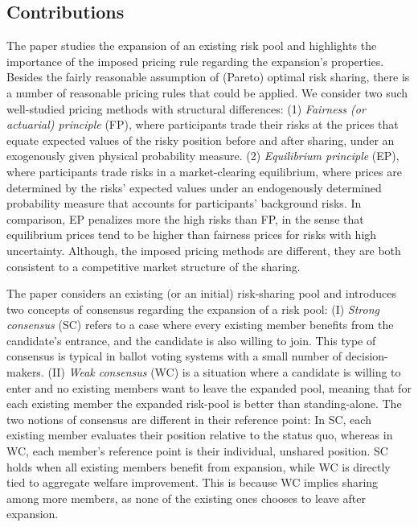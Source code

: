 \documentclass[fleqn,mnsc,nonblindrev]{informs4}
\begin{document}
\subsection{Contributions}
   {The paper studies the expansion of an existing risk pool and highlights the importance of the imposed pricing rule regarding the expansion's properties. Besides the fairly reasonable assumption of (Pareto) optimal risk sharing, there is a number of reasonable pricing rules that could be applied.
We consider two such well-studied pricing methods with structural differences: (1) {\it Fairness (or actuarial) principle} (FP), where participants trade their risks at the prices that equate expected values of the risky position before and after sharing, under an exogenously given physical probability measure. (2) {\it Equilibrium principle} (EP), where participants trade risks in a market-clearing equilibrium, where prices are determined by the risks' expected values under an endogenously determined probability measure that accounts for participants' background risks. In comparison, EP penalizes more the high risks than FP, in the sense that equilibrium prices tend to be higher than fairness prices for risks with high uncertainty. Although, the imposed pricing methods are different, they are both consistent to a competitive market structure of the sharing.}

   {The paper considers an existing (or an initial) risk-sharing pool and} introduces two concepts of consensus regarding the expansion of a risk pool: (I) {\it Strong consensus}   {(SC)} refers to a case where every existing member benefits from the candidate's entrance, and the candidate is also willing to join. This type of consensus is typical in ballot voting systems with a small number of decision-makers. (II) {\it Weak consensus}   {(WC)} is a situation where a candidate is willing to enter and no existing members want to leave the expanded pool, meaning that for each existing member the expanded risk-pool is better than standing-alone. The two notions of consensus are different in their reference point:    {In SC, each existing member evaluates their position relative to the status quo, whereas in WC, each member's reference point is their individual, unshared position. SC holds when all existing members benefit from expansion, while WC is directly tied to aggregate welfare improvement. This is because WC implies sharing among more members, as none of the existing ones chooses to leave after expansion.}
\end{document}
